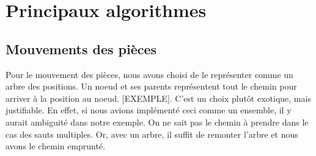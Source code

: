 \section*{Principaux algorithmes}
\subsection*{Mouvements des pièces}
Pour le mouvement des pièces, nous avons choisi de le représenter comme
un arbre des positions. Un noeud et ses parents représentent tout le 
chemin pour arriver à la position au noeud. [EXEMPLE]. C'est un choix
plutôt exotique, mais justifiable. En effet, si nous avions implémenté
ceci comme un ensemble, il y aurait ambiguité dans notre exemple.
On ne sait pas le chemin à prendre dans le cas des sauts multiples. Or,
avec un arbre, il suffit de remonter l'arbre et nous avons le chemin
emprunté.